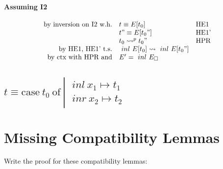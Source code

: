 \documentclass{article}
\newcommand{\inl}[0]{\ensuremath{\ inl\ }}
\newcommand{\inr}[0]{\ensuremath{\ inr\ }}
\newcommand{\case}[3]{\ensuremath{\text{case}\ #1\ \text{of}\ \left|\begin{aligned}#2\\#3\end{aligned}\right.}}
\begin{document}
\paragraph{Assuming I2}
\[
    \begin{array}{rl @{\quad} l}
        \text{by inversion on I2 w.h.}   &  t \equiv E[t_0]         & \text{HE1}\\
                                         &  t" \equiv E[t_0"]        & \text{HE1'}\\
                                         &  t_0 \leadsto^p t_0"     & \text{HPR}\\
        \text{by HE1, HE1' t.s.}         &  \inl E[t_0] \leadsto \inl E[t_0"] \\
        \text{by ctx with HPR and}       &  E' = \inl E _\square \\
    \end{array}
\]

\subsection{$t \equiv \case{t_0}{\inl x_1 \mapsto t_1}{\inr x_2 \mapsto t_2}$}

\section{Missing Compatibility Lemmas}
Write the proof for these compatibility lemmas:
\end{document}
